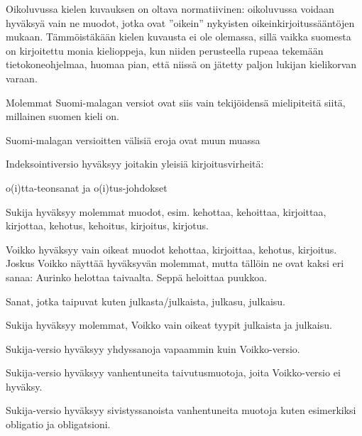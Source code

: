 \documentclass[12pt]{article}
\begin{document}
Oikoluvussa kielen kuvauksen on oltava normatiivinen: oikoluvussa
voidaan hyväksyä vain ne muodot, jotka ovat ''oikein'' nykyisten
oikeinkirjoitussääntöjen mukaan. Tämmöistäkään kielen kuvausta ei ole
olemassa, sillä vaikka suomesta on kirjoitettu monia kielioppeja, kun
niiden perusteella rupeaa tekemään tietokoneohjelmaa, huomaa pian,
että niissä on jätetty paljon lukijan kielikorvan varaan.

Molemmat Suomi-malagan versiot ovat siis vain tekijöidensä
mielipiteitä siitä, millainen suomen kieli on.

\bigskip

Suomi-malagan versioitten välisiä eroja ovat muun muassa

Indeksointiversio hyväksyy joitakin yleisiä kirjoitusvirheitä:

o(i)tta-teonsanat ja o(i)tus-johdokset

Sukija hyväksyy molemmat muodot, esim. kehottaa, kehoittaa,
kirjoittaa, kirjottaa, kehotus, kehoitus, kirjoitus, kirjotus.

Voikko hyväksyy vain oikeat muodot kehottaa, kirjoittaa, kehotus,
kirjoitus. Joskus Voikko näyttää hyväksyvän molemmat, mutta tällöin ne
ovat kaksi eri sanaa: Aurinko helottaa taivaalta. Seppä heloittaa
puukkoa.


Sanat, jotka taipuvat kuten julkasta/julkaista, julkasu, julkaisu.

Sukija hyväksyy molemmat, Voikko vain oikeat tyypit julkaista ja
julkaisu.

Sukija-versio hyväksyy yhdyssanoja vapaammin kuin Voikko-versio.

Sukija-versio hyväksyy vanhentuneita taivutusmuotoja, joita
Voikko-versio ei hyväksy.

Sukija-versio hyväksyy sivistyssanoista vanhentuneita muotoja kuten
esimerkiksi obligatio ja obligatsioni.



\end{document}
